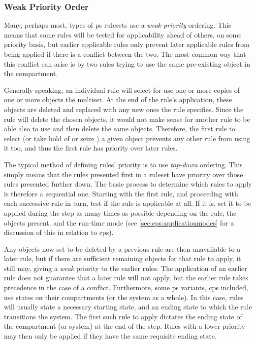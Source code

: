\subsubsection{Weak Priority Order}

Many, perhaps most, types of \gls{ps} \glspl{ruleset} use a \emph{weak-priority} ordering.  This means that some rules will be tested for applicability ahead of others, on some priority basis, but earlier applicable rules only prevent later applicable rules from being applied if there is a conflict between the two.  The most common way that this conflict can arise is by two rules trying to use the same pre-existing object in the \gls{compartment}.

Generally speaking, an individual rule will select for use one or more copies of one or more objects the multiset.  At the end of the rule's application, these objects are deleted and replaced with any new ones the rule specifies.  Since the rule will delete the chosen objects, it would not make sense for another rule to be able also to use and then delete the same objects.  Therefore, the first rule to select (or take hold of or seize \etc{}) a given object prevents any other rule from using it too, and thus the first rule has priority over later rules.

The typical method of defining rules' priority is to use \emph{top-down} ordering.  This simply means that the rules presented first in a \gls{ruleset} have priority over those rules presented further down.  The basic process to determine which rules to apply is therefore a sequential one.  Starting with the first rule, and proceeding with each successive rule in turn, test if the rule is applicable at all.  If it is, set it to be applied during the step as many times as possible depending on the rule, the objects present, and the run-time mode (see \eg{} \cref{sec:cps:applicationmodes} for a discussion of this in relation to \gls{cps}).

Any objects now set to be deleted by a previous rule are then unavailable to a later rule, but if there are sufficient remaining objects for that rule to apply, it still may, giving a \emph{weak} priority to the earlier rules.  The application of an earlier rule does not guarantee that a later rule will not apply, but the earlier rule takes precedence in the case of a conflict.  Furthermore, some \gls{ps} variants, \gls{cps} included, use states on their \glspl{compartment} (or the system as a whole).  In this case, rules will usually state a necessary starting state, and an ending state to which the rule transitions the system.  The first such rule to apply dictates the ending state of the \gls{compartment} (or system) at the end of the step.  Rules with a lower priority may then only be applied if they have the same requisite ending state.

